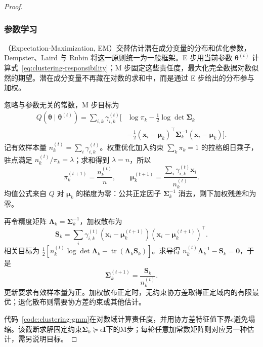 \begin{proof}
\subsubsection{参数学习}

（Expectation-Maximization, EM）交替估计潜在成分变量的分布和优化参数，Dempster、Laird 与 Rubin 将这一原则统一为一般框架。E 步用当前参数 $\bm{\theta}^{(t)}$ 计算式~\eqref{eq:clustering-responsibility}；M 步固定这些责任度，最大化完全数据对数似然的期望。潜在成分变量不再藏在对数的求和中，而是通过 E 步给出的分布参与加权。

忽略与参数无关的常数，M 步目标为
\begin{equation}
 \begin{aligned}
 Q(\bm{\theta}\mid\bm{\theta}^{(t)})
 =\sum_{i,k}\gamma_{i,k}^{(t)}
 \biggl[&\log\pi_k-\frac12\log\det\bm{\Sigma}_k\\
 &-\frac12(\bm{x}_i-\bm{\mu}_k)^\top
 \bm{\Sigma}_k^{-1}(\bm{x}_i-\bm{\mu}_k)\biggr].
 \end{aligned}
 \label{eq:clustering-gmm-q}
\end{equation}
记有效样本量 $n_k^{(t)}=\sum_i\gamma_{i,k}^{(t)}$。权重优化加入约束 $\sum_k\pi_k=1$ 的拉格朗日乘子，驻点满足 $n_k^{(t)}/\pi_k=\lambda$；求和得到 $\lambda=n$，所以
\begin{equation}
 \pi_k^{(t+1)}=\frac{n_k^{(t)}}{n},\qquad
 \bm{\mu}_k^{(t+1)}
 =\frac{\sum_i\gamma_{i,k}^{(t)}\bm{x}_i}{n_k^{(t)}}.
 \label{eq:clustering-gmm-mean}
\end{equation}
均值公式来自 $Q$ 对 $\bm{\mu}_k$ 的梯度为零：公共正定因子 $\bm{\Sigma}_k^{-1}$ 消去，剩下加权残差和为零。

再令精度矩阵 $\bm{\Lambda}_k=\bm{\Sigma}_k^{-1}$，加权散布为
\[
 \bm{S}_k=\sum_i\gamma_{i,k}^{(t)}
 (\bm{x}_i-\bm{\mu}_k^{(t+1)})
 (\bm{x}_i-\bm{\mu}_k^{(t+1)})^\top.
\]
相关目标为 $\tfrac12[n_k^{(t)}\log\det\bm{\Lambda}_k-\operatorname{tr}(\bm{\Lambda}_k\bm{S}_k)]$。求导得 $n_k^{(t)}\bm{\Lambda}_k^{-1}-\bm{S}_k=\bm{0}$，于是
\begin{equation}
 \bm{\Sigma}_k^{(t+1)}
 =\frac{\bm{S}_k}{n_k^{(t)}}.
 \label{eq:clustering-gmm-covariance}
\end{equation}
更新要求有效样本量为正。加权散布正定时，无约束协方差取得正定域内的有限最优；退化散布则需要协方差约束或其他估计。

代码~\ref{code:clustering-gmm}在对数域计算责任度，并用协方差特征值下界$\epsilon$避免塌缩。该截断求解固定约束$\bm{\Sigma}_k\succeq\epsilon\bm{I}$下的M步；每轮任意加常数矩阵则对应另一种估计，需另说明目标。


\end{proof}
